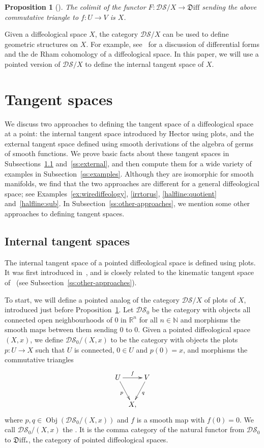 \documentclass[12pt]{amsart}
\newcommand{\dfn}[1]{\textbf{\boldmath{#1}}}
\newtheorem{prop}[de]{Proposition}
\theoremstyle{remark}
\newcommand{\ra}{\to}
\DeclareMathOperator{\obj}{Obj}
\newcommand{\Diff}{{\mathfrak{D}\mathrm{iff}}}
\newcommand{\DS}{{\mathcal{DS}}}
\def \N{\mathbb{N}}
\def \R{\mathbb{R}}
\begin{document}
\begin{prop}[{\cite[Proposition~2.7]{CSW}}]\label{colim}
The colimit of the functor $F:\DS/X \ra \Diff$
sending the above commutative triangle to $f:U \ra V$ is $X$.
\end{prop}

Given a diffeological space $X$, the category $\DS/X$ can be used to define
geometric structures on $X$.
For example, see~\cite{I3} for a discussion of differential forms and the
de Rham cohomology of a diffeological space.
In this paper, we will use a pointed version of $\DS/X$ to
define the internal tangent space of $X$.

\section{Tangent spaces}

We discuss two approaches to defining the tangent space of a diffeological space at a point:
the internal tangent space introduced by Hector using plots,
and the external tangent space defined using smooth derivations of the
algebra of germs of smooth functions.
We prove basic facts about these tangent spaces in Subsections~\ref{ss:internal}
and~\ref{ss:external}, and then compute them for a wide variety of examples
in Subsection~\ref{ss:examples}.
Although they are isomorphic for smooth manifolds,
we find that the two approaches are different for a general diffeological space;
see Examples~\ref{ex:wirediffeology}, \ref{irrtorus},
\ref{halfline:quotient} and~\ref{halfline:sub}.
In Subsection~\ref{ss:other-approaches}, we mention some other
approaches to defining tangent spaces.

\subsection{Internal tangent spaces}\label{ss:internal}

The internal tangent space of a pointed diffeological space is defined using plots.
It was first introduced in~\cite{He},
and is closely related to the kinematic tangent space of~\cite{KM}
(see Subsection~\ref{ss:other-approaches}).

\medskip

To start, we will define a pointed analog of the category $\DS/X$ of plots
of $X$, introduced just before Proposition~\ref{colim}.
Let $\DS_0$ be the category with
objects all connected open neighbourhoods of $0$ in $\R^n$ for all $n \in \N$
and morphisms the smooth maps between them sending $0$ to $0$.
Given a pointed diffeological space $(X,x)$,
we define $\DS_0/(X,x)$ to be the category
with objects the plots $p:U \ra X$ such that $U$ is connected, $0 \in U$ and $p(0)=x$,
and morphisms the commutative triangles
\[
\xymatrix@C5pt{U \ar[dr]_p \ar[rr]^f & & V \ar[dl]^q \\ & X , }
\]
where $p,q \in \obj(\DS_0/(X,x))$ and $f$ is a smooth map with $f(0)=0$.
We call $\DS_0/(X,x)$ the \dfn{category of plots of $X$ centered at $x$}.
It is the comma category of the natural functor from $\DS_0$ to
$\Diff_{*}$, the category of pointed diffeological spaces.
\end{document}
